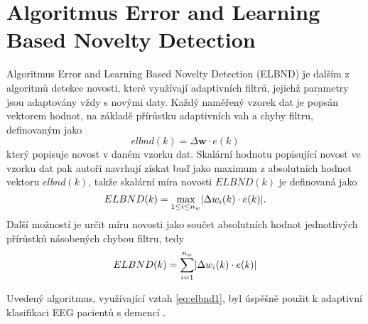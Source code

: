 \section{Algoritmus Error and Learning Based Novelty Detection}\label{chap:elbnd}
Algoritmus Error and Learning Based Novelty Detection (ELBND) \cite{elbnd1,elbnd2} je dalším z algoritmů detekce novosti, které využívají adaptivních filtrů, jejichž parametry jsou adaptovány vždy s novými daty. Každý naměřený vzorek dat je popsán vektorem hodnot, na základě přírůstku adaptivních vah a chyby filtru, definovaným jako
\begin{equation}
	elbnd(k)=\Delta\textbf{w}\cdot e(k)
\end{equation}
který popisuje novost v daném vzorku dat. Skalární hodnotu popisující novost ve vzorku dat pak autoři navrhují získat buď jako maximum z absolutních hodnot vektoru $elbnd(k)$, takže skalární míra novosti $ELBND(k)$ je definovaná jako
\begin{equation}\label{eq:elbnd1}
ELBND(k) = \max_{1\leq i \leq n_w} \lvert\Delta w_i(k) \cdot e(k)\rvert.
\end{equation}
Další možností je určit míru novosti jako součet absolutních hodnot jednotlivých přírůstků násobených chybou filtru, tedy
\begin{equation}\label{eq:elbnd2}
	ELBND(k)=\sum_{i=1}^{n_w}\lvert\Delta w_i(k)\cdot e(k)\rvert
\end{equation}

Uvedený algoritmus, využívající vztah \ref{eq:elbnd1}, byl úspěšně použit k adaptivní klasifikaci EEG pacientů s demencí \cite{elbnd3}.